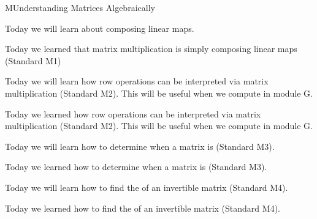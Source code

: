 \begin{module}{M}{Understanding Matrices Algebraically}








\newModuleSection
\begin{goals}
Today we will learn about composing linear maps.
\end{goals}
\begin{summary}
Today we learned that matrix multiplication is simply composing linear maps (Standard M1)
\end{summary}

\newModuleSection
\begin{goals}
Today we will learn how row operations can be interpreted via matrix multiplication (Standard M2). This will be useful when we compute  in module G.
\end{goals}
\begin{summary}
Today we learned how row operations can be interpreted via matrix multiplication (Standard M2). This will be useful when we compute  in module G.
\end{summary}

\newModuleSection
\begin{goals}
Today we will learn how to determine when a matrix is (Standard M3).
\end{goals}
\begin{summary}
Today we learned how to determine when a matrix is  (Standard M3).
\end{summary}

\newModuleSection
\begin{goals}
Today we will learn how to find the  of an invertible matrix (Standard M4).
\end{goals}
\begin{summary}
Today we learned how to find the  of an invertible matrix (Standard M4).
\end{summary}


\end{module}
